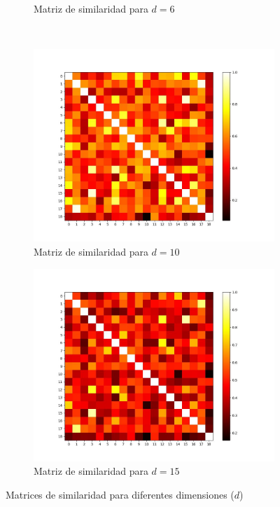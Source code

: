 \documentclass[12pt,a4]{article} %
\begin{document}
\begin{figure}[H]
\begin{subfigure}{0.45\textwidth}
        \caption{Matriz de similaridad para $d = 6$}
        \label{fig:similarity_d6}
    \end{subfigure}
    \\
    \begin{subfigure}{0.45\textwidth}
        \includegraphics[width=\linewidth]{latex_project/Graficos_ej2/similarity_matrix_10.jpeg}
        \caption{Matriz de similaridad para $d = 10$}
        \label{fig:similarity_d10}
    \end{subfigure}
    \hfill
    \begin{subfigure}{0.45\textwidth}
        \includegraphics[width=\linewidth]{latex_project/Graficos_ej2/similarity_matrix_15.jpeg}
        \caption{Matriz de similaridad para $d = 15$}
        \label{fig:similarity_d15}
    \end{subfigure}
    \caption{Matrices de similaridad para diferentes dimensiones ($d$)}
    \label{fig:similarity_matrices}
\end{figure}
\end{document}

